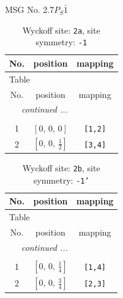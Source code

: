 \documentclass[fleqn,8pt]{jsarticle}
\begin{document}
\setcounter{MaxMatrixCols}{32}

\renewcommand{\tablename}{Table~}
\renewcommand{\figurename}{Figure~}
\begin{center}
\LARGE
MSG No. 2.7\quad$P_{S}\bar{1}$
\end{center}
\renewcommand{\arraystretch}{1.2}
\begin{longtable}{ccc}
\caption{Wyckoff site: {\tt 2a}, site symmetry: {\tt -1}}
 \\
 \hline \hline
No. & position & mapping \\ \hline \endfirsthead

\multicolumn{2}{l}{\tablename\ \thetable{}} \\
 \hline \hline
No. & position & mapping \\ \hline \endhead

 \hline \hline
\multicolumn{2}{r}{\footnotesize\it continued ...} \\ \endfoot

 \hline \hline
\multicolumn{2}{r}{} \\ \endlastfoot

1 & $\left[ 0,\, 0,\, 0 \right]$ & {\tt [1,2]} \\ \hline
2 & $\left[ 0,\, 0,\, \frac{1}{2} \right]$ & {\tt [3,4]} \\
\end{longtable}
\renewcommand{\arraystretch}{1.2}
\begin{longtable}{ccc}
\caption{Wyckoff site: {\tt 2b}, site symmetry: {\tt -1'}}
 \\
 \hline \hline
No. & position & mapping \\ \hline \endfirsthead

\multicolumn{2}{l}{\tablename\ \thetable{}} \\
 \hline \hline
No. & position & mapping \\ \hline \endhead

 \hline \hline
\multicolumn{2}{r}{\footnotesize\it continued ...} \\ \endfoot

 \hline \hline
\multicolumn{2}{r}{} \\ \endlastfoot

1 & $\left[ 0,\, 0,\, \frac{1}{4} \right]$ & {\tt [1,4]} \\ \hline
2 & $\left[ 0,\, 0,\, \frac{3}{4} \right]$ & {\tt [2,3]} \\
\end{longtable}
\renewcommand{\arraystretch}{1.2}
\end{document}
